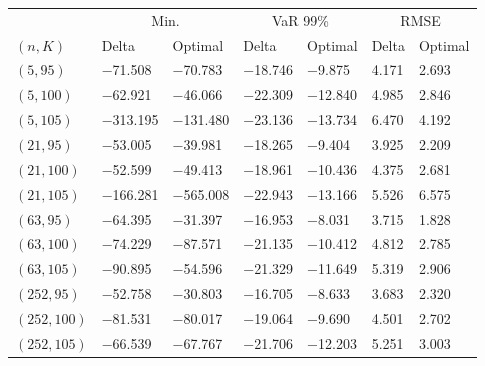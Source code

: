 \begin{tabular}{lllllll}
\toprule
& \multicolumn{2}{c}{Min.} & \multicolumn{2}{c}{VaR 99\%} & \multicolumn{2}{c}{RMSE}\\
$(n,K)$& Delta & Optimal & Delta & Optimal & Delta & Optimal\\
\midrule
$(5,95)$ & \num{-71.508} & \num{-70.783} & \num{-18.746} & \num{-9.875} & \num{4.171} & \num{2.693}\\
$(5,100)$ & \num{-62.921} & \num{-46.066} & \num{-22.309} & \num{-12.840} & \num{4.985} & \num{2.846}\\
$(5,105)$ & \num{-313.195} & \num{-131.480} & \num{-23.136} & \num{-13.734} & \num{6.470} & \num{4.192}\\
$(21,95)$ & \num{-53.005} & \num{-39.981} & \num{-18.265} & \num{-9.404} & \num{3.925} & \num{2.209}\\
$(21,100)$ & \num{-52.599} & \num{-49.413} & \num{-18.961} & \num{-10.436} & \num{4.375} & \num{2.681}\\
$(21,105)$ & \num{-166.281} & \num{-565.008} & \num{-22.943} & \num{-13.166} & \num{5.526} & \num{6.575}\\
$(63,95)$ & \num{-64.395} & \num{-31.397} & \num{-16.953} & \num{-8.031} & \num{3.715} & \num{1.828}\\
$(63,100)$ & \num{-74.229} & \num{-87.571} & \num{-21.135} & \num{-10.412} & \num{4.812} & \num{2.785}\\
$(63,105)$ & \num{-90.895} & \num{-54.596} & \num{-21.329} & \num{-11.649} & \num{5.319} & \num{2.906}\\
$(252,95)$ & \num{-52.758} & \num{-30.803} & \num{-16.705} & \num{-8.633} & \num{3.683} & \num{2.320}\\
$(252,100)$ & \num{-81.531} & \num{-80.017} & \num{-19.064} & \num{-9.690} & \num{4.501} & \num{2.702}\\
$(252,105)$ & \num{-66.539} & \num{-67.767} & \num{-21.706} & \num{-12.203} & \num{5.251} & \num{3.003}\\
\bottomrule
\end{tabular}